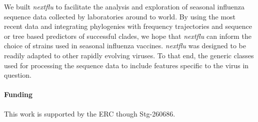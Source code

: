 \documentclass{bioinfo}
\newcommand{\nextflu}{\textit{nextflu}}
\begin{document}
We built \nextflu{} to facilitate the analysis and exploration of seasonal influenza sequence data collected by laboratories around to world.
By using the most recent data and integrating phylogenies with frequency trajectories and sequence or tree based predictors of successful clades, we hope that \nextflu{} can inform the choice of strains used in seasonal influenza vaccines. 
\nextflu{} was designed to be readily adapted to other rapidly evolving viruses. To that end, the generic classes used for processing the sequence data to include features specific to the virus in question. 

\paragraph{Funding\textcolon}This work is supported by the ERC though Stg-260686.


\end{document}
